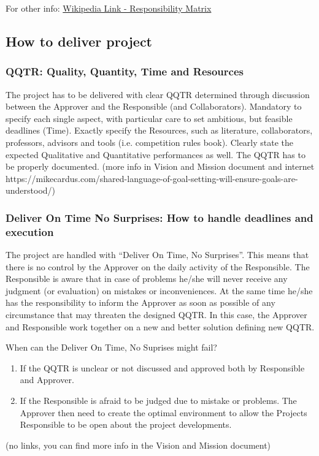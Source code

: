 \documentclass[graybox]{svmult}
\begin{document}
For other info: \href{https://en.wikipedia.org/wiki/Responsibility_assignment_matrix}{Wikipedia Link -  Responsibility Matrix}


\subsection{How to deliver project}
\subsubsection{QQTR: Quality, Quantity, Time and Resources}
The project has to be delivered with clear QQTR determined through discussion between the Approver and the Responsible (and Collaborators).
Mandatory to specify each single aspect, with particular care to set ambitious, but feasible deadlines (Time). Exactly specify the Resources, such as literature, collaborators, professors, advisors and tools (i.e. competition rules book). Clearly state the expected Qualitative and Quantitative performances as well.
The QQTR has to be properly documented.
(more info in Vision and Mission document and internet https://mikecardus.com/shared-language-of-goal-setting-will-ensure-goals-are-understood/)

\subsubsection{Deliver On Time No Surprises: How to handle deadlines and execution}
The project are handled with “Deliver On Time, No Surprises”. This means that there is no control by the Approver on the daily activity of the Responsible. The Responsible is aware that in case of problems he/she will never receive any judgment (or evaluation) on mistakes or inconveniences. At the same time he/she has the responsibility to inform the Approver as soon as possible of any circumstance that may threaten the designed QQTR. In this case, the Approver and Responsible work together on a new and better solution defining new QQTR.

\begin{svgraybox}
When can the Deliver On Time, No Suprises might fail?
\begin{enumerate}
\item If the QQTR is unclear or not discussed and approved both by Responsible and Approver.
\item If the Responsible is afraid to be judged due to mistake or problems. The Approver then need to create the optimal environment to allow the Projects Responsible to be open about the project developments.
\end{enumerate}
(no links, you can find more info in the Vision and Mission document)
\end{svgraybox}
\end{document}
